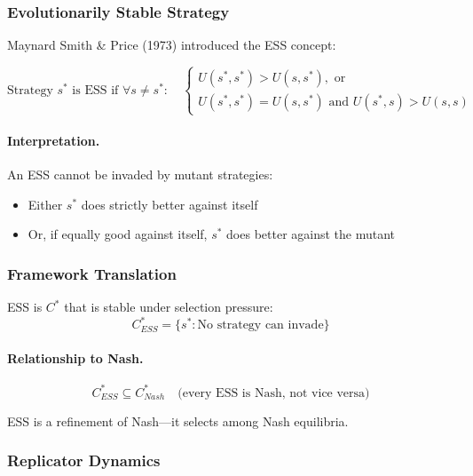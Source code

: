 \subsubsection{Evolutionarily Stable Strategy}

Maynard Smith \& Price (1973) introduced the ESS concept:

\begin{equation}
\boxed{
\text{Strategy } s^* \text{ is ESS if } \forall s \neq s^*: \quad
\begin{cases}
U(s^*, s^*) > U(s, s^*), \text{ or} \\
U(s^*, s^*) = U(s, s^*) \text{ and } U(s^*, s) > U(s, s)
\end{cases}
}
\label{eq:ess}
\end{equation}

\paragraph{Interpretation.}
An ESS cannot be invaded by mutant strategies:
\begin{itemize}
    \item Either $s^*$ does strictly better against itself
    \item Or, if equally good against itself, $s^*$ does better against the mutant
\end{itemize}

\subsubsection{Framework Translation}

ESS is $C^*$ that is stable under selection pressure:
\begin{equation}
C^*_{ESS} = \{s^* : \text{No strategy can invade}\}
\end{equation}

\paragraph{Relationship to Nash.}
\begin{equation}
C^*_{ESS} \subseteq C^*_{Nash} \quad \text{(every ESS is Nash, not vice versa)}
\end{equation}

ESS is a refinement of Nash---it selects among Nash equilibria.

\subsubsection{Replicator Dynamics}

